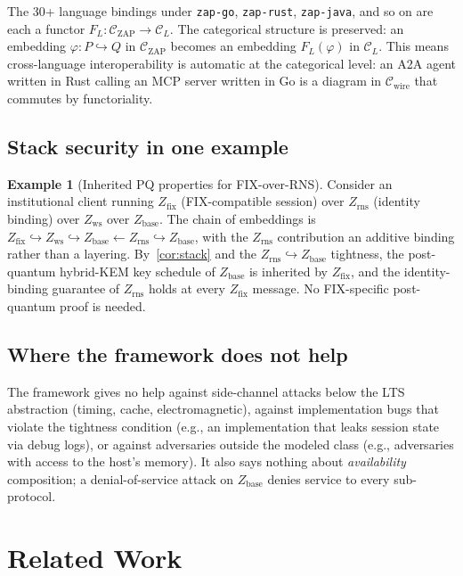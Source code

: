 \documentclass[11pt]{article}
\theoremstyle{definition}
\newtheorem{example}[theorem]{Example}
\theoremstyle{remark}
\newcommand{\CZ}{\mathcal{C}_{\mathrm{ZAP}}}
\newcommand{\Zb}{Z_{\mathrm{base}}}
\newcommand{\Zw}{Z_{\mathrm{ws}}}
\newcommand{\Zf}{Z_{\mathrm{fix}}}
\newcommand{\Zr}{Z_{\mathrm{rns}}}
\begin{document}
The 30+ language bindings under \texttt{zap-go}, \texttt{zap-rust},
\texttt{zap-java}, and so on are each a functor $F_L : \CZ \to
\mathcal{C}_L$. The categorical structure is preserved: an embedding
$\varphi : P \hookrightarrow Q$ in $\CZ$ becomes an embedding
$F_L(\varphi)$ in $\mathcal{C}_L$. This means cross-language
interoperability is automatic at the categorical level: an A2A
agent written in Rust calling an MCP server written in Go is a
diagram in $\mathcal{C}_{\mathrm{wire}}$ that commutes by
functoriality.

\subsection{Stack security in one example}

\begin{example}[Inherited PQ properties for FIX-over-RNS]
\label{ex:fix-pq}
Consider an institutional client running $\Zf$ (FIX-compatible
session) over $\Zr$ (identity binding) over $\Zw$ over $\Zb$. The
chain of embeddings is
$\Zf \hookrightarrow \Zw \hookrightarrow \Zb \leftarrow \Zr
\hookrightarrow \Zb$, with the $\Zr$ contribution an additive
binding rather than a layering. By~\cref{cor:stack} and the
$\Zr \hookrightarrow \Zb$ tightness, the post-quantum hybrid-KEM key
schedule of $\Zb$ is inherited by $\Zf$, and the identity-binding
guarantee of $\Zr$ holds at every $\Zf$ message. No FIX-specific
post-quantum proof is needed.
\end{example}

\subsection{Where the framework does not help}

The framework gives no help against side-channel attacks below the
LTS abstraction (timing, cache, electromagnetic), against
implementation bugs that violate the tightness condition (e.g., an
implementation that leaks session state via debug logs), or against
adversaries outside the modeled class (e.g., adversaries with
access to the host's memory). It also says nothing about
\emph{availability} composition; a denial-of-service attack on $\Zb$
denies service to every sub-protocol.

\section{Related Work}
\label{sec:related}
\end{document}
